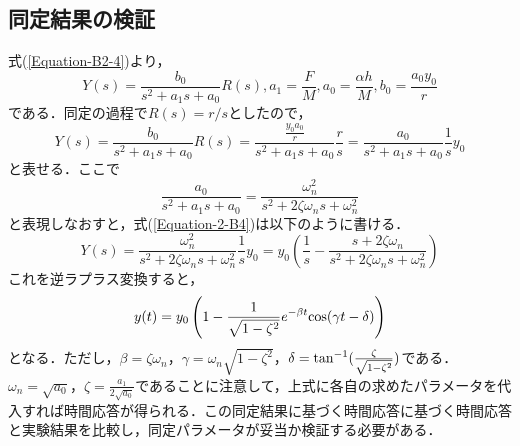 \documentclass[12pt]{jsarticle}
\begin{document}
\subsection{同定結果の検証}
式(\ref{Equation-B2-4})より，
\begin{equation}
  \label{Equation-2-B3}
  Y(s) = \frac{b_0}{s^2+a_1 s + a_0}R(s),    a_1=\frac{F}{M}, a_0=\frac{\alpha h}{M}, b_0=\frac{a_0 y_0}{r}
\end{equation}
である．同定の過程で$R(s)=r/s$としたので，
\begin{equation}
  \label{Equation-2-B4}
  Y(s) = \frac{b_0}{s^2+a_1 s + a_0} R(s) = \frac{\frac{y_0 a_0}{r}}{s^2+a_1s+a_0}\frac{r}{s} = \frac{a_0}{s^2+a_1s+a_0}\frac{1}{s}y_0
\end{equation}
と表せる．ここで
\begin{equation}
  \label{Equation-2-B5}
  \frac{a_0}{s^2+a_1s+a_0} = \frac{\omega_n^2}{s^2+2\zeta \omega_ns + \omega_n^2}
\end{equation}
と表現しなおすと，式(\ref{Equation-2-B4})は以下のように書ける．
\begin{equation}
  \label{Equation-2-B6}
  Y(s) = \frac{\omega_n^2}{s^2+2\zeta \omega_n s + \omega_n^2}\frac{1}{s}y_0 = y_0(\frac{1}{s} - \frac{s+2\zeta \omega_n}{s^2 + 2\zeta \omega_n s + \omega_n^2})
\end{equation}
これを逆ラプラス変換すると，
\begin{equation}
  \label{Equation-2-B7}
  y(t) = y_0 \left(1 - \frac{1}{\sqrt{1-\zeta^2}}e^{-\beta t} {\rm cos}(\gamma t - \delta)\right)
\end{equation}
となる．ただし，$\beta=\zeta \omega_n$，$\gamma =\omega_n \sqrt{1-\zeta^2}$，$\delta={\rm tan}^{-1}(\frac{\zeta}{\sqrt{1-\zeta^2}})$である．$\omega_n=\sqrt{a_0}$，$\zeta=\frac{a_1}{2\sqrt{a_0}}$であることに注意して，上式に各自の求めたパラメータを代入すれば時間応答が得られる．この同定結果に基づく時間応答に基づく時間応答と実験結果を比較し，同定パラメータが妥当か検証する必要がある．
\end{document}
